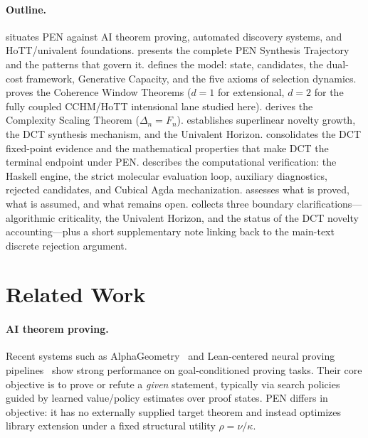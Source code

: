 \documentclass[11pt,a4paper]{article}
\theoremstyle{plain}
\theoremstyle{definition}
\theoremstyle{remark}
\begin{document}
\paragraph{Outline.}
 situates PEN against AI theorem proving, automated discovery systems, and HoTT/univalent foundations.
 presents the complete PEN Synthesis Trajectory and the patterns that govern it.
 defines the model: state, candidates, the dual-cost framework, Generative Capacity, and the five axioms of selection dynamics.
 proves the Coherence Window Theorems ($d = 1$ for extensional, $d = 2$ for the fully coupled CCHM/HoTT intensional lane studied here).
 derives the Complexity Scaling Theorem ($\Delta_n = F_n$).
 establishes superlinear novelty growth, the DCT synthesis mechanism, and the Univalent Horizon.
 consolidates the DCT fixed-point evidence and the mathematical properties that make DCT the terminal endpoint under PEN.
 describes the computational verification: the Haskell engine, the strict molecular evaluation loop, auxiliary diagnostics, rejected candidates, and Cubical Agda mechanization.
 assesses what is proved, what is assumed, and what remains open.
 collects three boundary clarifications---algorithmic criticality, the Univalent Horizon, and the status of the DCT novelty accounting---plus a short supplementary note linking back to the main-text discrete rejection argument.

\section{Related Work}
\label{sec:related}

\paragraph{AI theorem proving.}
Recent systems such as AlphaGeometry~\cite{alphageometry} and Lean-centered neural proving pipelines~\cite{leandojo,openai-lean} show strong performance on goal-conditioned proving tasks.
Their core objective is to prove or refute a \emph{given} statement, typically via search policies guided by learned value/policy estimates over proof states.
PEN differs in objective: it has no externally supplied target theorem and instead optimizes library extension under a fixed structural utility $\rho=\nu/\kappa$.
\end{document}
